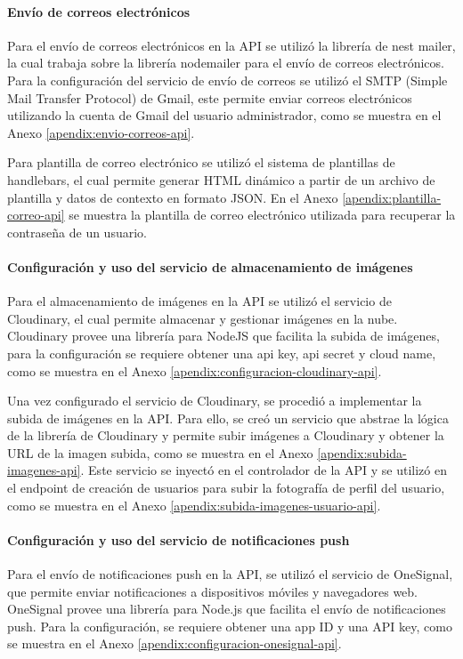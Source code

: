 \paragraph{Envío de correos electrónicos}
Para el envío de correos electrónicos en la API se utilizó la librería de nest mailer, la cual trabaja sobre la librería nodemailer
para el envío de correos electrónicos. Para la configuración del servicio de envío de correos se utilizó el SMTP (Simple Mail Transfer
Protocol) de Gmail, este permite enviar correos electrónicos utilizando la cuenta de Gmail del usuario administrador, como se muestra
en el Anexo \ref{apendix:envio-correos-api}.
\bigbreak

Para plantilla de correo electrónico se utilizó el sistema de plantillas de handlebars, el cual permite generar HTML dinámico a partir
de un archivo de plantilla y datos de contexto en formato JSON. En el Anexo \ref{apendix:plantilla-correo-api} se muestra la plantilla
de correo electrónico utilizada para recuperar la contraseña de un usuario.

\paragraph{Configuración y uso del servicio de almacenamiento de imágenes}
Para el almacenamiento de imágenes en la API se utilizó el servicio de Cloudinary, el cual permite almacenar y gestionar imágenes en la nube.
Cloudinary provee una librería para NodeJS que facilita la subida de imágenes, para la configuración se requiere obtener una api key, api secret
y cloud name, como se muestra en el Anexo \ref{apendix:configuracion-cloudinary-api}.
\bigbreak

Una vez configurado el servicio de Cloudinary, se procedió a implementar la subida de imágenes en la API. Para ello, se creó un servicio
que abstrae la lógica de la librería de Cloudinary y permite subir imágenes a Cloudinary y obtener la URL de la imagen subida, como se
muestra en el Anexo \ref{apendix:subida-imagenes-api}. Este servicio se inyectó en el controlador de la API y se utilizó en el endpoint
de creación de usuarios para subir la fotografía de perfil del usuario, como se muestra en el Anexo \ref{apendix:subida-imagenes-usuario-api}.

\paragraph{Configuración y uso del servicio de notificaciones push}
Para el envío de notificaciones push en la API, se utilizó el servicio de OneSignal, que permite enviar notificaciones a dispositivos
móviles y navegadores web. OneSignal provee una librería para Node.js que facilita el envío de notificaciones push. Para la configuración,
se requiere obtener una app ID y una API key, como se muestra en el Anexo \ref{apendix:configuracion-onesignal-api}.
\bigbreak


